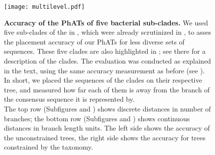 \begin{figure}[hpbt]
    \centering
    \texttt{[image: multilevel.pdf]}
    \begin{subfigure}{0pt}
        \label{fig:multilevel:sub:edge_unconstr}
    \end{subfigure}
    \begin{subfigure}{0pt}
        \label{fig:multilevel:sub:edge_constr}
    \end{subfigure}
    \begin{subfigure}{0pt}
        \label{fig:multilevel:sub:branch_unconstr}
    \end{subfigure}
    \begin{subfigure}{0pt}
        \label{fig:multilevel:sub:branch_constr}
    \end{subfigure}
    \caption[Accuracy of the \acsp{PhAT} of five bacterial sub-clades]{
        \textbf{Accuracy of the \acsp{PhAT} of five bacterial sub-clades.}
        We used five sub-clades of the  in ,
        which were already scrutinized in \citep{Kozlov2016},
        to asses the placement accuracy of our \acp{PhAT} for less diverse sets of sequences.
        These five clades are also highlighted in ;
        see there for a description of the clades.
        The evaluation was conducted as explained in the text,
        using the same accuracy measurement as before 
        (see ).
        In short, we placed the  sequences of the clades on their respective tree,
        and measured how far each of them is away from the branch of the consensus sequence it is represented by.
        \\
        The top row (Subfigures  and )
        shows discrete distances in number of branches;
        the bottom row (Subfigures  and )
        shows continuous distances in branch length units.
        The left side shows the accuracy of the unconstrained trees,
        the right side shows the accuracy for trees constrained by the  taxonomy.
    }
    \label{fig:multilevel}
\end{figure}

